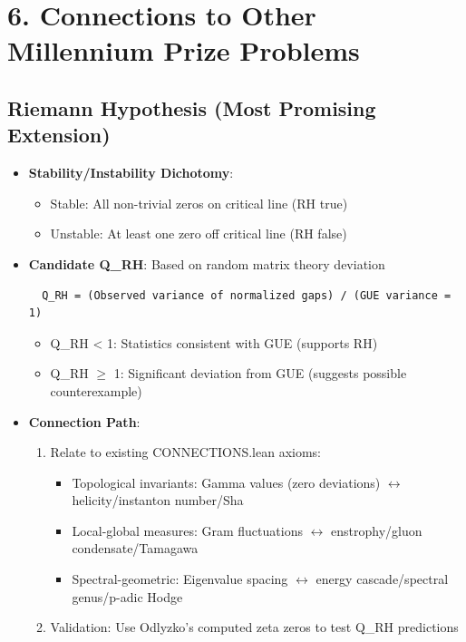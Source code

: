 \documentclass[11pt]{article}
\begin{document}
\section{6. Connections to Other Millennium Prize Problems}

\subsection{Riemann Hypothesis (Most Promising Extension)}
\begin{itemize}
\item \textbf{Stability/Instability Dichotomy}:
  \begin{itemize}
  \item Stable: All non-trivial zeros on critical line (RH true)
  \item Unstable: At least one zero off critical line (RH false)
  \end{itemize}
\item \textbf{Candidate Q\_RH}: Based on random matrix theory deviation
  \begin{verbatim}
  Q_RH = (Observed variance of normalized gaps) / (GUE variance = 1)
  \end{verbatim}
  \begin{itemize}
  \item Q\_RH < 1: Statistics consistent with GUE (supports RH)
  \item Q\_RH $\geq$ 1: Significant deviation from GUE (suggests possible counterexample)
  \end{itemize}
\item \textbf{Connection Path}:
  \begin{enumerate}
  \item Relate to existing CONNECTIONS.lean axioms:
    \begin{itemize}
    \item Topological invariants: Gamma values (zero deviations) $\leftrightarrow$ helicity/instanton number/Sha
    \item Local-global measures: Gram fluctuations $\leftrightarrow$ enstrophy/gluon condensate/Tamagawa
    \item Spectral-geometric: Eigenvalue spacing $\leftrightarrow$ energy cascade/spectral genus/p-adic Hodge
    \end{itemize}
  \item Validation: Use Odlyzko's computed zeta zeros to test Q\_RH predictions
  \end{enumerate}
\end{itemize}
\end{document}
